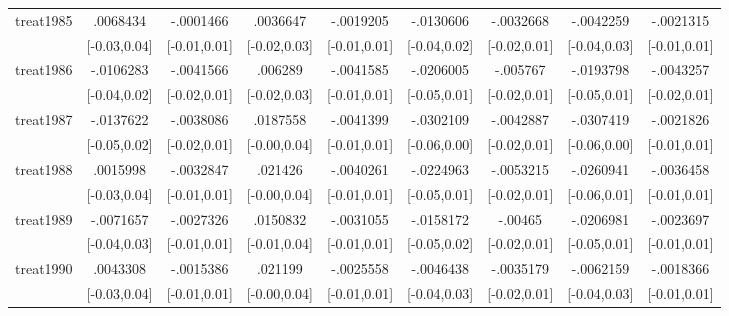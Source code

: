 \begin{table}[htbp]
\begin{tabular}{l*{8}{c}}
treat1985   &    .0068434         &   -.0001466         &    .0036647         &   -.0019205         &   -.0130606         &   -.0032668         &   -.0042259         &   -.0021315         \\
            &[-0.03,0.04]         &[-0.01,0.01]         &[-0.02,0.03]         &[-0.01,0.01]         &[-0.04,0.02]         &[-0.02,0.01]         &[-0.04,0.03]         &[-0.01,0.01]         \\
treat1986   &   -.0106283         &   -.0041566         &     .006289         &   -.0041585         &   -.0206005         &    -.005767         &   -.0193798         &   -.0043257         \\
            &[-0.04,0.02]         &[-0.02,0.01]         &[-0.02,0.03]         &[-0.01,0.01]         &[-0.05,0.01]         &[-0.02,0.01]         &[-0.05,0.01]         &[-0.02,0.01]         \\
treat1987   &   -.0137622         &   -.0038086         &    .0187558         &   -.0041399         &   -.0302109         &   -.0042887         &   -.0307419         &   -.0021826         \\
            &[-0.05,0.02]         &[-0.02,0.01]         &[-0.00,0.04]         &[-0.01,0.01]         &[-0.06,0.00]         &[-0.02,0.01]         &[-0.06,0.00]         &[-0.01,0.01]         \\
treat1988   &    .0015998         &   -.0032847         &     .021426         &   -.0040261         &   -.0224963         &   -.0053215         &   -.0260941         &   -.0036458         \\
            &[-0.03,0.04]         &[-0.01,0.01]         &[-0.00,0.04]         &[-0.01,0.01]         &[-0.05,0.01]         &[-0.02,0.01]         &[-0.06,0.01]         &[-0.01,0.01]         \\
treat1989   &   -.0071657         &   -.0027326         &    .0150832         &   -.0031055         &   -.0158172         &     -.00465         &   -.0206981         &   -.0023697         \\
            &[-0.04,0.03]         &[-0.01,0.01]         &[-0.01,0.04]         &[-0.01,0.01]         &[-0.05,0.02]         &[-0.02,0.01]         &[-0.05,0.01]         &[-0.01,0.01]         \\
treat1990   &    .0043308         &   -.0015386         &     .021199         &   -.0025558         &   -.0046438         &   -.0035179         &   -.0062159         &   -.0018366         \\
            &[-0.03,0.04]         &[-0.01,0.01]         &[-0.00,0.04]         &[-0.01,0.01]         &[-0.04,0.03]         &[-0.02,0.01]         &[-0.04,0.03]         &[-0.01,0.01]         \\

\end{tabular}
\end{table}
